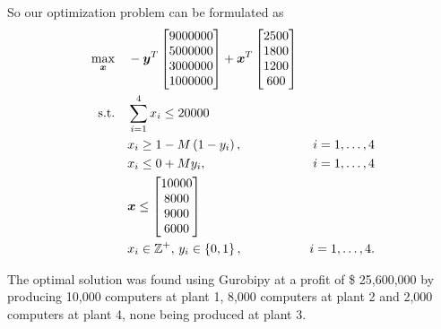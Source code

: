 \documentclass[a4paper]{report}
\begin{document}
So our optimization problem can be formulated as
\begin{align*}
    \max_{\bm{x}} \quad & -\bm{y}^{T} \begin{bmatrix} 9000000 \\ 5000000 \\ 3000000 \\ 1000000 \end{bmatrix} + \bm{x}^{T}\begin{bmatrix} 2500 \\ 1800 \\ 1200 \\ 600 \end{bmatrix} \\
    \textrm{s.t.} \quad & \sum_{i=1}^{4} x_i \le 20 000 \\
			&x_i \ge 1 - M \left( 1-y_i \right),&i=1,\ldots,4 \\
			&x_i \le 0 + M y_i,& i=1,\ldots,4 \\
			& \bm{x} \le \begin{bmatrix} 10000 \\ 8000 \\ 9000 \\ 6000 \end{bmatrix} \\
			& x_i \in \mathbb{Z}^{+},\, y_i \in \left\{ 0,1 \right\} ,&i=1,\ldots,4
.\end{align*}

The optimal solution was found using Gurobipy at a profit of \$ 25,600,000 by producing 10,000 computers at plant 1, 8,000 computers at plant 2 and 2,000 computers at plant 4, none being produced at plant 3.
\end{document}
